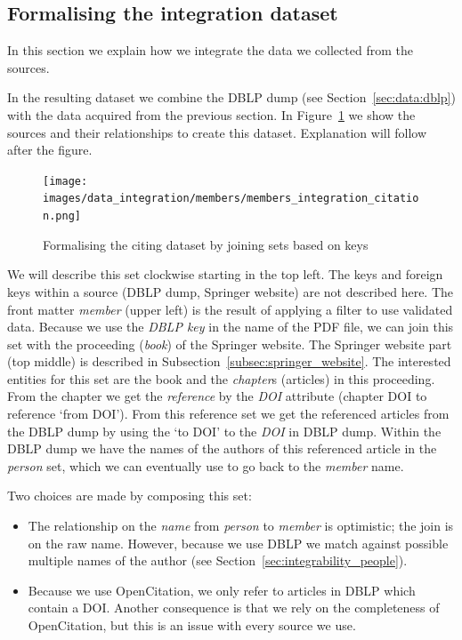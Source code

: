 \documentclass{ou-report}
\newcommand{\doi}{{DOI}}
\newcommand{\dblp}{DBLP}
\begin{document}
\subsection{Formalising the integration dataset}
In this section we explain how we integrate the data we collected from the 
sources.



In the resulting dataset we combine the \dblp{} dump (see Section~\ref{sec:data:dblp}) 
with the data acquired from the previous section.
In Figure~\ref{fig:members_integration_citation} we show the sources and their 
relationships to create this dataset. Explanation will follow after the figure.
\begin{figure}[ht]
    \centering
    \texttt{[image: images/data\_integration/members/members\_integration\_citation.png]}
    \caption{Formalising the citing dataset by joining sets based on keys}
    \label{fig:members_integration_citation}
\end{figure}

We will describe this set clockwise starting in the top left. The keys and
foreign keys within a source (\dblp{} dump, Springer website) are not described
here.
The front matter \emph{member} (upper left) is the result of applying a filter
to use validated data. Because we use the \textit{\dblp{} key} in the name of
the PDF file, we can join this set with the proceeding (\emph{book}) of the
Springer website.
%
The Springer website part (top middle) is described in 
Subsection~\ref{subsec:springer_website}. The interested entities for this set
are the book and the \emph{chapter}s (articles) in this proceeding. 
%
From the chapter we get the \emph{reference} by the \textit{\doi{}} attribute 
(chapter \doi{} to reference `from \doi{}'). From this reference set we get the 
referenced articles from the \dblp{} dump by using the `to \doi{}' to the 
\emph{\doi{}} in \dblp{} dump.
%
Within the \dblp{} dump we have the names of the authors
of this referenced article in the \emph{person} set, which we can eventually
use to go back to the \emph{member} name.

Two choices are made by composing this set:
\begin{itemize}
    \item The relationship on the \textit{name} from \emph{person} to 
        \emph{member} is optimistic; the join is on the raw name. 
        However, because we use \dblp{} we match against possible multiple names
        of the author (see Section~\ref{sec:integrability_people}).
    \item Because we use OpenCitation, we only refer to articles in \dblp{}
        which contain a \doi{}. Another consequence is that we rely on the
        completeness of  OpenCitation, but this is an issue with every source we
        use.
\end{itemize}
\end{document}
